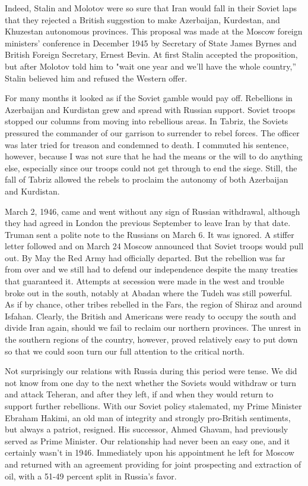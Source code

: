 Indeed, Stalin and Molotov were so sure that Iran would fall in their Soviet laps that they rejected a British suggestion to make Azerbaijan, Kurdestan, and Khuzestan autonomous provinces. This proposal was made at the Moscow foreign ministers’ conference in December 1945 by Secretary of State James Byrnes and British Foreign Secretary, Ernest Bevin. At first Stalin accepted the proposition, but after Molotov told him to "wait one year and we'll have the whole country,” Stalin believed him and refused the Western offer. 

For many months it looked as if the Soviet gamble would pay off. Rebellions in Azerbaijan and Kurdistan grew and spread with Russian support. Soviet troops stopped our columns from moving into rebellious areas. In Tabriz, the Soviets pressured the commander of our garrison to surrender to rebel forces. The officer was later tried for treason and condemned to death. I commuted his sentence, however, because I was not sure that he had the means or the will to do anything else, especially since our troops could not get through to end the siege. Still, the fall of Tabriz allowed the rebels to proclaim the autonomy of both Azerbaijan and Kurdistan. 

March 2, 1946, came and went without any sign of Russian withdrawal, although they had agreed in London the previous September to leave Iran by that date. Truman sent a polite note to the Russians on March 6. It was ignored. A stiffer letter followed and on March 24 Moscow announced that Soviet troops would pull out. By May the Red Army had officially departed. But the rebellion was far from over and we still had to defend our independence despite the many treaties that guaranteed it. Attempts at secession were made in the west and trouble broke out in the south, notably at Abadan where the Tudeh was still powerful. As if by chance, other tribes rebelled in the Fars, the region of Shiraz and around Isfahan. Clearly, the British and Americans were ready to occupy the south and divide Iran again, should we fail to reclaim our northern provinces. The unrest in the southern regions of the country, however, proved relatively easy to put down so that we could soon turn our full attention to the critical north. 

Not surprisingly our relations with Russia during this period were tense. We did not know from one day to the next whether the Soviets would withdraw or turn and attack Teheran, and after they left, if and when they would return to support further rebellions. With our Soviet policy stalemated, my Prime Minister Ebraham Hakimi, an old man of integrity and strongly pro-British sentiments, but always a patriot, resigned. His successor, Ahmed Ghavam, had previously served as Prime Minister. Our relationship had never been an easy one, and it certainly wasn't in 1946. Immediately upon his appointment he left for Moscow and returned with an agreement providing for joint prospecting and extraction of oil, with a 51-49 percent split in Russia's favor. 

